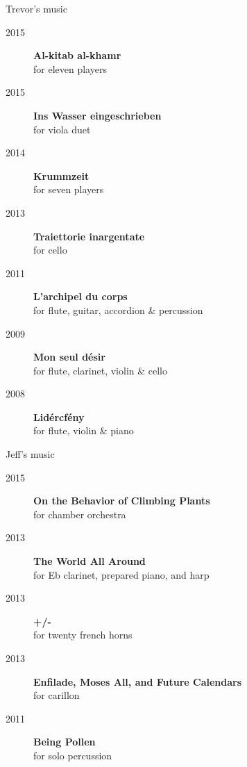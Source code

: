 \begin{frame}{Trevor's music}
    \begin{description}
        \item[2015] \textbf{Al-kitab al-khamr} \\
            for eleven players
        \item[2015] \textbf{Ins Wasser eingeschrieben} \\
            for viola duet
        \item[2014] \textbf{Krummzeit} \\
            for seven players
        \item[2013] \textbf{Traiettorie inargentate} \\
            for cello
        \item[2011] \textbf{L'archipel du corps} \\
            for flute, guitar, accordion \& percussion
        \item[2009] \textbf{Mon seul désir} \\
            for flute, clarinet, violin \& cello
        \item[2008] \textbf{Lidércfény} \\
            for flute, violin \& piano
    \end{description}
\end{frame}

\begin{frame}{Jeff's music}
    \begin{description}
        \item[2015] \textbf{On the Behavior of Climbing Plants} \\
            for chamber orchestra
        \item[2013] \textbf{The World All Around} \\
            for Eb clarinet, prepared piano, and harp
        \item[2013] \textbf{+/-} \\
            for twenty french horns
        \item[2013] \textbf{Enfilade, Moses All, and Future Calendars} \\
            for carillon
        \item[2011] \textbf{Being Pollen} \\
            for solo percussion
    \end{description}
\end{frame}